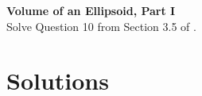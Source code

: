 \documentclass{article}
\begin{document}
\item %
\textbf{Volume of an Ellipsoid, Part I}\\
Solve Question 10 from Section 3.5 of \VCT.
\item %

\EEN %

\newpage
\section*{Solutions}
\end{document}
